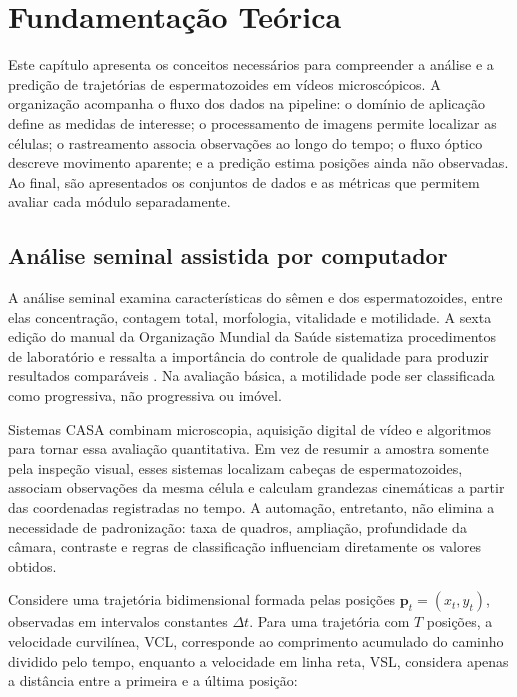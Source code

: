 \chapter[Fundamentação Teórica]{Fundamentação Teórica}

Este capítulo apresenta os conceitos necessários para compreender a análise e a predição de trajetórias de espermatozoides em vídeos microscópicos. A organização acompanha o fluxo dos dados na pipeline: o domínio de aplicação define as medidas de interesse; o processamento de imagens permite localizar as células; o rastreamento associa observações ao longo do tempo; o fluxo óptico descreve movimento aparente; e a predição estima posições ainda não observadas. Ao final, são apresentados os conjuntos de dados e as métricas que permitem avaliar cada módulo separadamente.

\section{Análise seminal assistida por computador}

A análise seminal examina características do sêmen e dos espermatozoides, entre elas concentração, contagem total, morfologia, vitalidade e motilidade. A sexta edição do manual da Organização Mundial da Saúde sistematiza procedimentos de laboratório e ressalta a importância do controle de qualidade para produzir resultados comparáveis \cite{who2021manual}. Na avaliação básica, a motilidade pode ser classificada como progressiva, não progressiva ou imóvel.

Sistemas \ac{CASA} combinam microscopia, aquisição digital de vídeo e algoritmos para tornar essa avaliação quantitativa. Em vez de resumir a amostra somente pela inspeção visual, esses sistemas localizam cabeças de espermatozoides, associam observações da mesma célula e calculam grandezas cinemáticas a partir das coordenadas registradas no tempo. A automação, entretanto, não elimina a necessidade de padronização: taxa de quadros, ampliação, profundidade da câmara, contraste e regras de classificação influenciam diretamente os valores obtidos.

Considere uma trajetória bidimensional formada pelas posições $\mathbf{p}_t=(x_t,y_t)$, observadas em intervalos constantes $\Delta t$. Para uma trajetória com $T$ posições, a velocidade curvilínea, \ac{VCL}, corresponde ao comprimento acumulado do caminho dividido pelo tempo, enquanto a velocidade em linha reta, \ac{VSL}, considera apenas a distância entre a primeira e a última posição:

